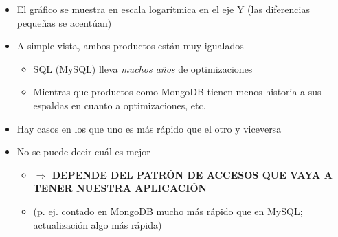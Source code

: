 \documentclass[14pt]{beamer}
\begin{document}
\begin{frame}[allowframebreaks]
\begin{itemize}
\item El gráfico se muestra en escala logarítmica en el eje Y (las
  diferencias pequeñas se acentúan)
\item A simple vista, ambos productos están muy igualados
  \begin{itemize}
  \item SQL (MySQL) lleva {\em muchos años} de optimizaciones
  \item Mientras que productos como MongoDB tienen menos historia a sus
    espaldas en cuanto a optimizaciones, etc.
  \end{itemize}
\item Hay casos en los que uno es más rápido que el otro y viceversa
\item No se puede decir cuál es mejor
  \begin{itemize}
  \item {\bf $\Rightarrow$ DEPENDE DEL PATRÓN DE ACCESOS QUE VAYA A TENER
      NUESTRA APLICACIÓN}
  \item (p. ej. contado en MongoDB mucho más rápido que en MySQL;
    actualización algo más rápida)
  \end{itemize}
\end{itemize}

\end{frame}

\end{document}
